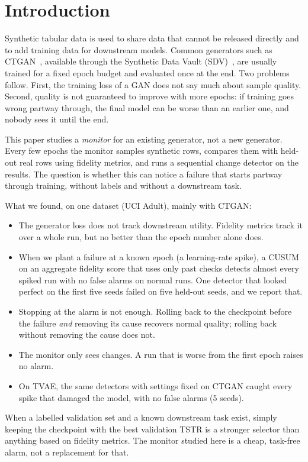 \documentclass[conference]{IEEEtran}
\begin{document}
\section{Introduction}
Synthetic tabular data is used to share data that cannot be released
directly and to add training data for downstream models. Common generators
such as CTGAN~\cite{xu2019ctgan}, available through the Synthetic Data Vault
(SDV)~\cite{patki2016sdv}, are usually trained for a fixed epoch budget and
evaluated once at the end. Two problems follow. First, the training loss of
a GAN does not say much about sample quality. Second, quality is not
guaranteed to improve with more epochs: if training goes wrong partway
through, the final model can be worse than an earlier one, and nobody sees it
until the end.

This paper studies a \emph{monitor} for an existing generator, not a new
generator. Every few epochs the monitor samples synthetic rows, compares them
with held-out real rows using fidelity metrics, and runs a sequential change
detector on the results. The question is whether this can notice a failure
that starts partway through training, without labels and without a
downstream task.

What we found, on one dataset (UCI Adult), mainly with CTGAN:
\begin{itemize}
\item The generator loss does not track downstream utility. Fidelity metrics
track it over a whole run, but no better than the epoch number alone does.
\item When we plant a failure at a known epoch (a learning-rate spike), a
CUSUM on an aggregate fidelity score that uses only past checks detects
almost every spiked run with no false alarms on normal runs. One detector
that looked perfect on the first five seeds failed on five held-out seeds,
and we report that.
\item Stopping at the alarm is not enough. Rolling back to the checkpoint
before the failure \emph{and} removing its cause recovers normal quality;
rolling back without removing the cause does not.
\item The monitor only sees changes. A run that is worse from the first
epoch raises no alarm.
\item On TVAE, the same detectors with settings fixed on CTGAN caught every
spike that damaged the model, with no false alarms (5 seeds).
\end{itemize}
When a labelled validation set and a known downstream task exist, simply
keeping the checkpoint with the best validation TSTR is a stronger selector
than anything based on fidelity metrics. The monitor studied here is a cheap,
task-free alarm, not a replacement for that.
\end{document}
